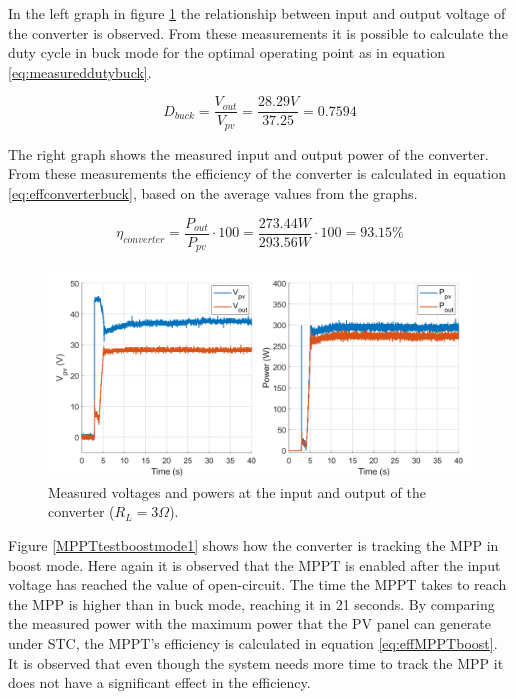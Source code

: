 In the left graph in figure \ref{MPPTtestbuckmode2} the relationship between input and output voltage of the converter is observed. From these measurements it is possible to calculate the duty cycle in buck mode for the optimal operating point as in equation \ref{eq:measureddutybuck}. 

\begin{equation} \label{eq:measureddutybuck}
D_{buck}= \dfrac{V_{out}}{V_{pv}} = \dfrac{28.29V}{37.25} = 0.7594
\end{equation}

The right graph shows the measured input and output power of the converter. From these measurements the efficiency of the converter is calculated in equation \ref{eq:effconverterbuck}, based on the average values from the graphs.

\begin{equation} \label{eq:effconverterbuck}
\eta_{converter}= \dfrac{P_{out}}{P_{pv}} \cdot 100 = \dfrac{273.44W}{293.56W} \cdot 100 = 93.15\% 
\end{equation}


\begin{figure}[H]
	\begin{center}
		\includegraphics[width=1\textwidth]{../Pictures/P1/Test/Buck_mode_MPPT_Vin_Vout_Pin_Pout}
		\caption{Measured voltages and powers at the input and output of the converter ($R_{L}=3\Omega$).}
		\label{MPPTtestbuckmode2}
	\end{center}	
\end{figure}

Figure \ref{MPPTtestboostmode1} shows how the converter is tracking the MPP in boost mode. Here again it is observed that the MPPT is enabled after the input voltage has reached the value of open-circuit. The time the MPPT takes to reach the MPP is higher than in buck mode, reaching it in 21 seconds. By comparing the measured power with the maximum power that the PV panel can generate under STC, the MPPT's efficiency is calculated in equation \ref{eq:effMPPTboost}. It is observed that even though the system needs more time to track the MPP it does not have a significant effect in the efficiency.

